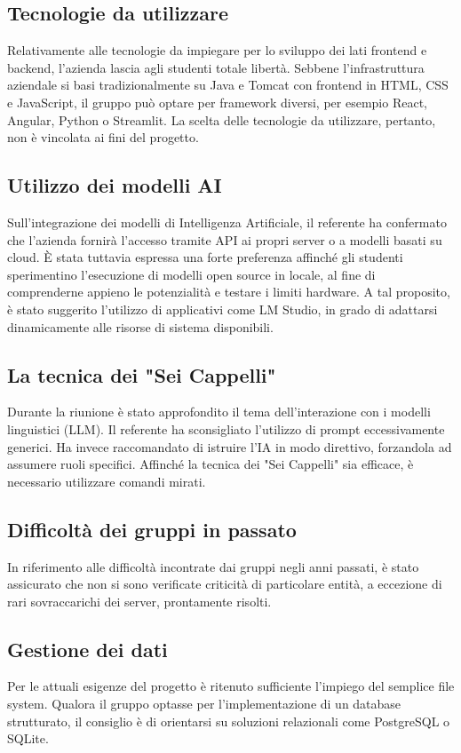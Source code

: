 \documentclass[a4paper,12pt]{article}
\begin{document}
\subsection{Tecnologie da utilizzare}
Relativamente alle tecnologie da impiegare per lo sviluppo dei lati frontend e backend, l'azienda lascia agli studenti totale libertà. Sebbene l'infrastruttura aziendale si basi tradizionalmente su Java e Tomcat con frontend in HTML, CSS e JavaScript, il gruppo può optare per framework diversi, per esempio React, Angular, Python o Streamlit. La scelta delle tecnologie da utilizzare, pertanto, non è vincolata ai fini del progetto.

\subsection{Utilizzo dei modelli AI}
Sull'integrazione dei modelli di Intelligenza Artificiale, il referente ha confermato che l'azienda fornirà l'accesso tramite API ai propri server o a modelli basati su cloud. È stata tuttavia espressa una forte preferenza affinché gli studenti sperimentino l'esecuzione di modelli open source in locale, al fine di comprenderne appieno le potenzialità e testare i limiti hardware. A tal proposito, è stato suggerito l'utilizzo di applicativi come LM Studio, in grado di adattarsi dinamicamente alle risorse di sistema disponibili.

\subsection{La tecnica dei "Sei Cappelli"}
Durante la riunione è stato approfondito il tema dell'interazione con i modelli linguistici (LLM). Il referente ha sconsigliato l'utilizzo di prompt eccessivamente generici. Ha invece raccomandato di istruire l'IA in modo direttivo, forzandola ad assumere ruoli specifici. Affinché la tecnica dei "Sei Cappelli" sia efficace, è necessario utilizzare comandi mirati.

\subsection{Difficoltà dei gruppi in passato}
In riferimento alle difficoltà incontrate dai gruppi negli anni passati, è stato assicurato che non si sono verificate criticità di particolare entità, a eccezione di rari sovraccarichi dei server, prontamente risolti.

\subsection{Gestione dei dati}
Per le attuali esigenze del progetto è ritenuto sufficiente l'impiego del semplice file system. Qualora il gruppo optasse per l'implementazione di un database strutturato, il consiglio è di orientarsi su soluzioni relazionali come PostgreSQL o SQLite.
\end{document}
